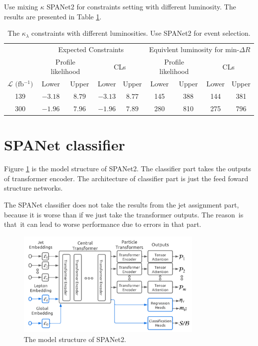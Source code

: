 \documentclass[12pt]{article}
\begin{document}
	Use mixing $\kappa$ SPANet2 for constraints setting with different luminosity. The results are presented in Table \ref{tab:kappa_constraint_luminosity_mix_class_SPANET2}.
	\begin{table}[htpb]
		\centering
		\caption{The $\kappa_\lambda$ constraints with different luminosities. Use SPANet2 for event selection.}
		\label{tab:kappa_constraint_luminosity_mix_class_SPANET2}
		\begin{tabular}{c|cc|cc|cc|cc}
										& \multicolumn{4}{c}{Expected Constraints}                         & \multicolumn{4}{c}{Equivlent luminosity for $\text{min-}\Delta R$}       \\
										& \multicolumn{2}{c}{Profile likelihood} & \multicolumn{2}{c}{CLs} & \multicolumn{2}{c}{Profile likelihood} & \multicolumn{2}{c}{CLs}         \\ \hline
		$\mathcal{L} \text{ (fb$^{-1}$)}$ & Lower               & Upper            & Lower       & Upper     & Lower              & Upper             & Lower          & Upper          \\ \hline
		139  & $-3.18$ & $8.79$ & $-3.13$ & $8.77$ & 145 & 388 & 144 & 381 \\
		300  & $-1.96$ & $7.96$ & $-1.96$ & $7.89$ & 280 & 810 & 275 & 796 \\
		\end{tabular}
	\end{table}
\section{SPANet classifier}%
\label{sec:spanet_classifier}
	Figure \ref{fig:SPANet2_structure} is the model structure of SPANet2. The classifier part takes the outputs of transformer encoder. The architecture of classifier part is just the feed foward structure networks.
	
	The SPANet classifier does not take the results from the jet assignment part, because it is worse than if we just take the transformer outputs. The reason is that it can lead to worse performance due to errors in that part.
	\begin{figure}[htpb]
		\centering
		\includegraphics[width=0.8\textwidth]{SPANet2_structure.png}
		\caption{The model structure of SPANet2.}
		\label{fig:SPANet2_structure}
	\end{figure}
\end{document}

